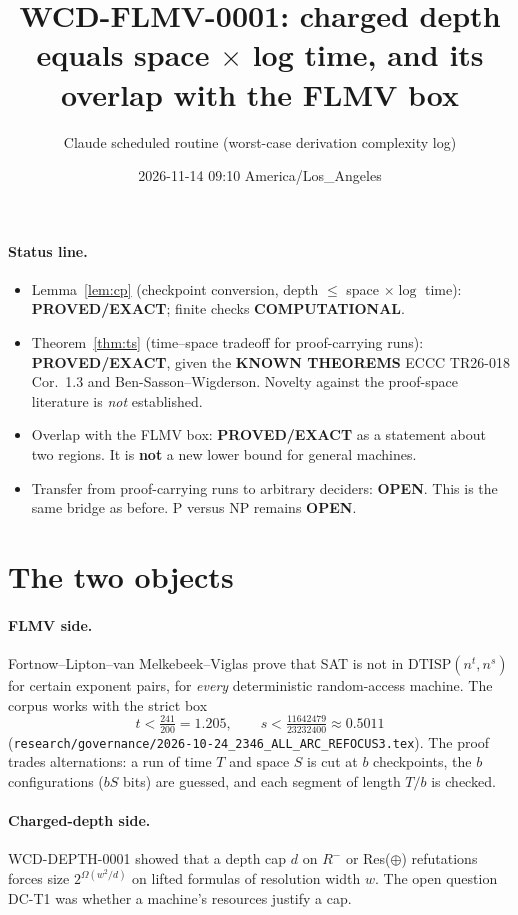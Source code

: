 \documentclass[11pt]{article}
\title{WCD-FLMV-0001: charged depth equals space $\times$ log time, and its overlap with the FLMV box}
\author{Claude scheduled routine (worst-case derivation complexity log)}
\date{2026-11-14 09:10 America/Los\_Angeles}
\begin{document}
\maketitle

\paragraph{Status line.}
\begin{itemize}
\item Lemma~\ref{lem:cp} (checkpoint conversion, depth $\le$ space $\times\log$ time): \textbf{PROVED/EXACT}; finite checks \textbf{COMPUTATIONAL}.
\item Theorem~\ref{thm:ts} (time--space tradeoff for proof-carrying runs): \textbf{PROVED/EXACT}, given the \textbf{KNOWN THEOREMS} ECCC TR26-018 Cor.~1.3 and Ben-Sasson--Wigderson. Novelty against the proof-space literature is \emph{not} established.
\item Overlap with the FLMV box: \textbf{PROVED/EXACT} as a statement about two regions. It is \textbf{not} a new lower bound for general machines.
\item Transfer from proof-carrying runs to arbitrary deciders: \textbf{OPEN}. This is the same bridge as before. P versus NP remains \textbf{OPEN}.
\end{itemize}

\section{The two objects}
\paragraph{FLMV side.} Fortnow--Lipton--van Melkebeek--Viglas prove that SAT is not in $\mathrm{DTISP}(n^{t},n^{s})$ for certain exponent pairs, for \emph{every} deterministic random-access machine. The corpus works with the strict box
\[t<\tfrac{241}{200}=1.205,\qquad s<\tfrac{11642479}{23232400}\approx0.5011\]
(\texttt{research/governance/2026-10-24\_2346\_ALL\_ARC\_REFOCUS3.tex}). The proof trades alternations: a run of time $T$ and space $S$ is cut at $b$ checkpoints, the $b$ configurations ($bS$ bits) are guessed, and each segment of length $T/b$ is checked.

\paragraph{Charged-depth side.} WCD-DEPTH-0001 showed that a depth cap $d$ on $R^-$ or Res($\oplus$) refutations forces size $2^{\Omega(w^2/d)}$ on lifted formulas of resolution width $w$. The open question DC-T1 was whether a machine's resources justify a cap.
\end{document}

